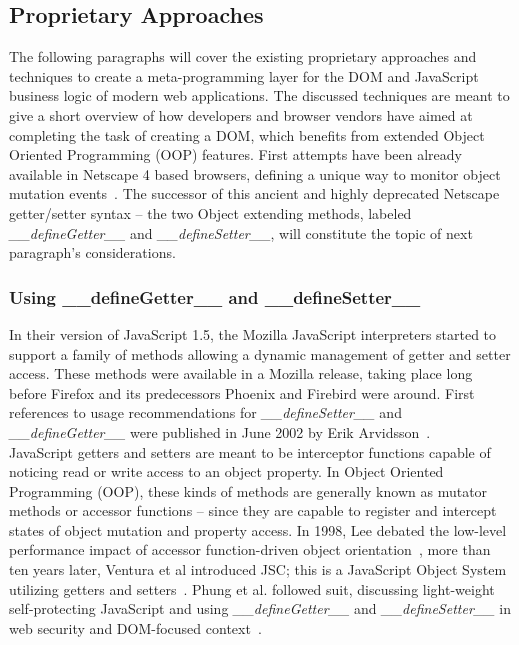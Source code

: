     \subsection{Proprietary Approaches}
    \label{subsubsec:6.3.1.proprietary_approaches}
  
      The following paragraphs will cover the existing proprietary approaches and techniques to create a meta-programming layer for the DOM and JavaScript business logic of modern web applications. The discussed techniques are meant to give a short overview of how developers and browser vendors have aimed at completing the task of creating a DOM, which benefits from extended Object Oriented Programming (OOP) features. First attempts have been already available in Netscape 4 based browsers, defining a unique way to monitor object mutation events~\cite{sun-netscape_alliance_core_2000}. The successor of this ancient and highly deprecated Netscape getter/setter syntax -- the two Object extending methods, labeled \textit{\_\_defineGetter\_\_} and \textit{\_\_defineSetter\_\_}, will constitute the topic of next paragraph's considerations. 

      \subsubsection{Using \_\_defineGetter\_\_ and \_\_defineSetter\_\_}
      \label{subsubsubsec:6.3.1.1.using_definegetter_and_definesetter}

      In their version of JavaScript 1.5, the Mozilla JavaScript interpreters started to support a family of methods allowing a dynamic management of getter and setter access. These methods were available in a Mozilla release, taking place long before Firefox and its predecessors Phoenix and Firebird were around. First references to usage recommendations for \textit{\_\_defineSetter\_\_} and \textit{\_\_defineGetter\_\_} were published in June 2002 by Erik Arvidsson~\cite{arvidsson_power_2002}. \\

      JavaScript getters and setters are meant to be interceptor functions capable of noticing read or write access to an object property. In Object Oriented Programming (OOP), these kinds of methods are generally known as mutator methods or accessor functions -- since they are capable to register and intercept states of object mutation and property access. In 1998, Lee debated the low-level performance impact of accessor function-driven object orientation~\cite{lee_run_1998}, more than ten years later, Ventura et al introduced JSC; this is a JavaScript Object System utilizing getters and setters~\cite{ventura2009jsc}. Phung et al. followed suit, discussing light-weight self-protecting JavaScript and using \textit{\_\_defineGetter\_\_} and \textit{\_\_defineSetter\_\_} in web security and DOM-focused context~\cite{phung_lightweight_2009}. \\


